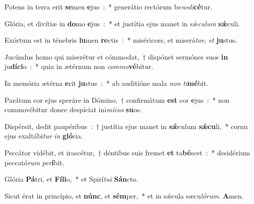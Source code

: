 ﻿\item Potens in terra erit \textbf{se}\-men \textbf{e}jus~:~* generátio rectórum be\emph{ne}\emph{di}\textbf{cé}tur.
\item Glória, et divítiæ in \textbf{do}\-mo \textbf{e}jus~:~* et justítia ejus manet in sǽ\emph{cu}\-\emph{lum} \textbf{sǽ}culi.
\item Exórtum est in ténebris \textbf{lu}\-men \textbf{re}\-ctis~:~* miséricors, et miserá\emph{tor}, \emph{et} \textbf{ju}stus.
\item Jucúndus homo qui miserétur et cómmodat,~† dispónet sermónes suos \textbf{in} ju\textbf{dí}\-\textbf{ci}\-o~:~* quia in ætérnum non \emph{com}\emph{mo}\textbf{vé}bitur.
\item In memória ætérna \textbf{e}\-rit \textbf{ju}\-stus~:~* ab auditióne mala \emph{non} \emph{ti}\textbf{mé}bit.
\item Parátum cor ejus speráre in Dómino,~† confirmátum \textbf{est} cor \textbf{e}jus~:~* non commovébitur donec despíciat ini\emph{mí}\-\emph{cos} \textbf{su}os.
\item Dispérsit, dedit paupéribus~:~† justítia ejus manet in \textbf{sǽ}\-culum \textbf{sǽ}\-\textbf{cu}\-li,~* cornu ejus exaltábi\emph{tur} \emph{in} \textbf{gló}ria.
\item Peccátor vidébit, et irascétur,~† déntibus suis fremet \textbf{et} ta\textbf{bé}\-scet~:~* desidérium peccató\emph{rum} \emph{per}\textbf{í}bit.
\item Glória \textbf{Pá}\-tri, et \textbf{Fí}\-\textbf{li}\-o,~* et Spirí\emph{tu}\-\emph{i} \textbf{Sán}cto.
\item Sicut érat in princípio, et \textbf{núnc}, et \textbf{sém}\-per,~* et in sǽcula sæcu\emph{ló}\-\emph{rum}. \textbf{A}men.